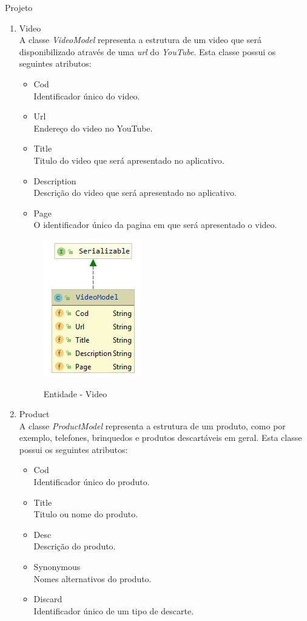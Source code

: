 \documentclass[
	12pt,				%
	openright,			%
	twoside,			%
	a4paper,			%
	english,			%
	french,				%
	spanish,			%
	brazil				%
	]{abntex2}
\begin{document}
\begin{chapter}{Projeto}
\begin{enumerate}
  \item{Video}  \\ A classe \textit{VideoModel} representa a estrutura de um video que será disponibilizado através de uma \textit{url} do \textit{YouTube}. Esta classe possui os seguintes atributos:
   \begin{itemize}
  \item{Cod}\\ Identificador único do video.
   \item{Url}\\ Endereço do video no YouTube.
     \item{Title}\\ Titulo do video que será apresentado no aplicativo.
       \item{Description}\\ Descrição do video que será apresentado no aplicativo.
         \item{Page}\\  O identificador único da pagina em que será apresentado o video.
\end{itemize}
  
\begin{figure}[h]
\centering
   \caption{Entidade - Video}
   \includegraphics[scale=1.0]{media/VideoModel.png}
     \label{fig:videomodel}
\end{figure}


  \item{Product} \\ A classe \textit{ProductModel} representa a estrutura de um produto, como por exemplo, telefones, brinquedos e produtos descartáveis em geral. Esta classe possui os seguintes atributos:
  
     \begin{itemize}
  \item{Cod}\\ Identificador único do produto.
     \item{Title}\\ Titulo ou nome do produto.
       \item{Desc}\\ Descrição do produto.
         \item{Synonymous}\\ Nomes alternativos do produto.
                  \item{Discard}\\ Identificador único de um tipo de descarte.
\end{itemize}
  

\end{enumerate}
\end{chapter}
\end{document}
